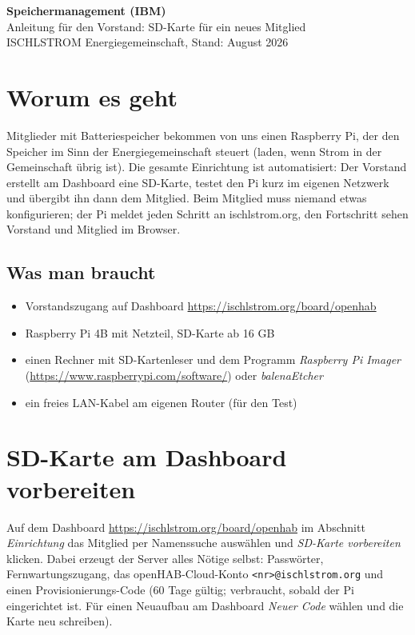 \documentclass[a4paper,11pt]{article}
\newcommand{\dash}{Dashboard \url{https://ischlstrom.org/board/openhab}}
\begin{document}
\begin{center}
    {\LARGE\bfseries Speichermanagement (IBM)}\\[0.3em]
    {\large Anleitung für den Vorstand: SD-Karte für ein neues Mitglied}\\[0.3em]
    {\small ISCHLSTROM Energiegemeinschaft, Stand: August 2026}
\end{center}

\section*{Worum es geht}

Mitglieder mit Batteriespeicher bekommen von uns einen Raspberry Pi, der
den Speicher im Sinn der Energiegemeinschaft steuert (laden, wenn Strom
in der Gemeinschaft übrig ist). Die gesamte Einrichtung ist automatisiert:
Der Vorstand erstellt am Dashboard eine SD-Karte, testet den Pi kurz im
eigenen Netzwerk und übergibt ihn dann dem Mitglied. Beim Mitglied muss
niemand etwas konfigurieren; der Pi meldet jeden Schritt an ischlstrom.org,
den Fortschritt sehen Vorstand und Mitglied im Browser.

\subsection*{Was man braucht}

\begin{itemize}[nosep]
    \item Vorstandszugang auf \dash
    \item Raspberry Pi 4B mit Netzteil, SD-Karte ab 16 GB
    \item einen Rechner mit SD-Kartenleser und dem Programm
          \emph{Raspberry Pi Imager} (\url{https://www.raspberrypi.com/software/})
          oder \emph{balenaEtcher}
    \item ein freies LAN-Kabel am eigenen Router (für den Test)
\end{itemize}

\section{SD-Karte am Dashboard vorbereiten}

Auf dem \dash{} im Abschnitt \emph{Einrichtung} das Mitglied per
Namenssuche auswählen und \emph{SD-Karte vorbereiten} klicken. Dabei
erzeugt der Server alles Nötige selbst: Passwörter, Fernwartungszugang,
das openHAB-Cloud-Konto \texttt{<nr>@ischlstrom.org} und einen
Provisionierungs-Code (60 Tage gültig; verbraucht, sobald der Pi
eingerichtet ist. Für einen Neuaufbau am Dashboard \emph{Neuer Code}
wählen und die Karte neu schreiben).
\end{document}
